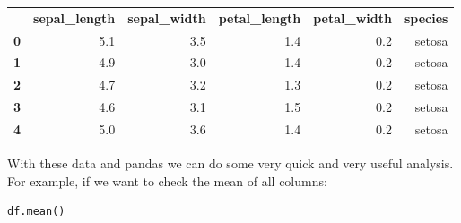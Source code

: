 \documentclass[12pt]{article}
\begin{document}
\begin{table}[!h]
    \centering
    \begin{tabular}{crrrrr}
    \multicolumn{1}{r}{\textbf{}} & \textbf{sepal\_length} & \textbf{sepal\_width} & \textbf{petal\_length} & \textbf{petal\_width} & \textbf{species} \\
    \textbf{0}                    & 5.1                    & 3.5                   & 1.4                    & 0.2                   & setosa           \\
    \textbf{1}                    & 4.9                    & 3.0                   & 1.4                    & 0.2                   & setosa           \\
    \textbf{2}                    & 4.7                    & 3.2                   & 1.3                    & 0.2                   & setosa           \\
    \textbf{3}                    & 4.6                    & 3.1                   & 1.5                    & 0.2                   & setosa           \\
    \textbf{4}                    & 5.0                    & 3.6                   & 1.4                    & 0.2                   & setosa          
    \end{tabular}
    \end{table}

With these data and pandas we can do some very quick and very useful analysis. For example, if we want to check the mean of all columns:
\begin{lstlisting}[language=Python]
    df.mean()
\end{lstlisting}


\end{document}

